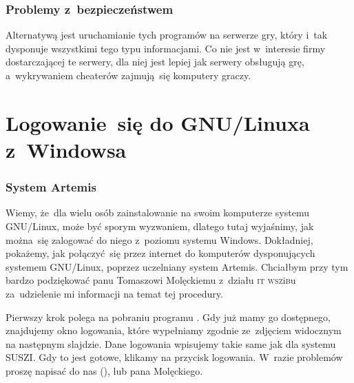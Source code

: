 \documentclass[10pt,t]{beamer}
\begin{document}
\begin{frame}
  \frametitle{Problemy z~bezpieczeństwem}


  Alternatywą jest uruchamianie tych programów na serwerze
  gry, który i~tak dysponuje wszystkimi tego typu informacjami. Co nie jest
  w~interesie firmy dostarczającej te serwery, dla niej jest lepiej jak
  serwery obsługują grę, a~wykrywaniem cheaterów zajmują~się komputery
  graczy.

\end{frame}










\section{Logowanie~się do GNU/Linuxa z~Windowsa}


\begin{frame}
  \frametitle{System Artemis}


  Wiemy, że~dla wielu osób zainstalowanie na swoim komputerze systemu
  GNU/Linux, może być sporym wyzwaniem, dlatego tutaj wyjaśnimy, jak
  można~się zalogować do niego z~poziomu systemu Windows. Dokładniej,
  pokażemy, jak połączyć~się przez internet do komputerów dysponujących
  systemem GNU/Linux, poprzez uczelniany system Artemis. Chciałbym przy tym
  bardzo podziękować panu Tomaszowi Molęckiemu z~działu \textsc{it}
  \textsc{wsz}i\textsc{b}u za~udzielenie mi informacji na temat tej
  procedury.

  Pierwszy krok polega na pobraniu programu
  . Gdy
  już mamy go dostępnego, znajdujemy okno logowania, które wypełniamy
  zgodnie ze~zdjęciem widocznym na następnym slajdzie. Dane logowania
  wpisujemy takie same jak dla systemu SUSZI. Gdy to jest gotowe, klikamy
  na przycisk logowania. W~razie problemów proszę napisać do nas (\email),
  lub pana Molęckiego.

\end{frame}
\end{document}
